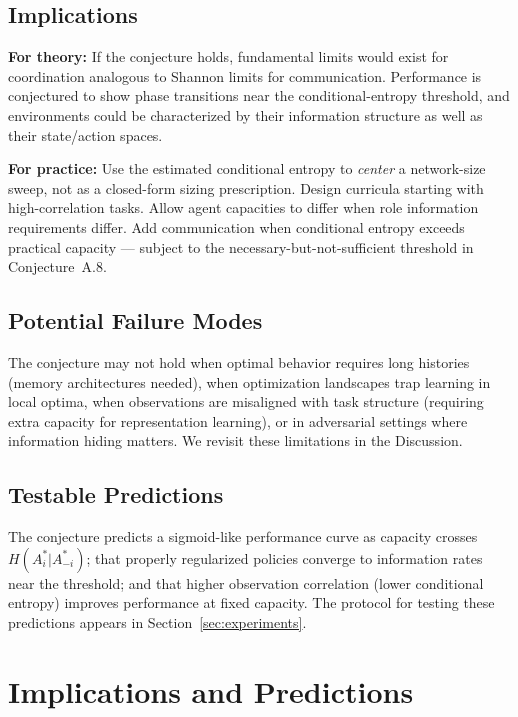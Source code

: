 \documentclass[10pt, letterpaper]{article}
\begin{document}
\subsection{Implications}

\textbf{For theory:} If the conjecture holds, fundamental limits would exist for coordination analogous to Shannon limits for communication. Performance is conjectured to show phase transitions near the conditional-entropy threshold, and environments could be characterized by their information structure as well as their state/action spaces.

\textbf{For practice:} Use the estimated conditional entropy to \emph{center} a network-size sweep, not as a closed-form sizing prescription. Design curricula starting with high-correlation tasks. Allow agent capacities to differ when role information requirements differ. Add communication when conditional entropy exceeds practical capacity --- subject to the necessary-but-not-sufficient threshold in Conjecture~A.8.

\subsection{Potential Failure Modes}

The conjecture may not hold when optimal behavior requires long histories (memory architectures needed), when optimization landscapes trap learning in local optima, when observations are misaligned with task structure (requiring extra capacity for representation learning), or in adversarial settings where information hiding matters. We revisit these limitations in the Discussion.

\subsection{Testable Predictions}

The conjecture predicts a sigmoid-like performance curve as capacity crosses $H(A_i^*|A_{-i}^*)$; that properly regularized policies converge to information rates near the threshold; and that higher observation correlation (lower conditional entropy) improves performance at fixed capacity. The protocol for testing these predictions appears in Section~\ref{sec:experiments}.

\section{Implications and Predictions}
\label{sec:implications}
\end{document}
